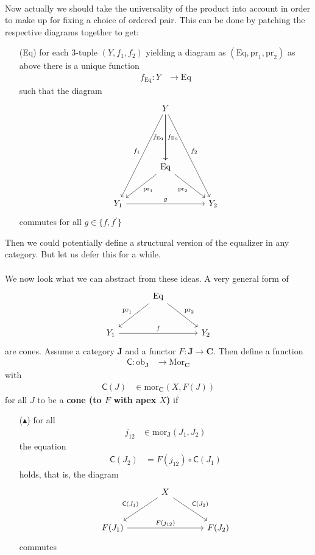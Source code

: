 \\
Now actually we should take the universality of the product into account in order to make up for fixing a choice of ordered pair. This can be done by patching the respective diagrams together to get:
\begin{enumerate}
\item[(Eq)]
for each $3$-tuple $(Y,f_{1},f_{2})$ yielding a diagram as $(\mathrm{Eq},\mathrm{pr}_{1},\mathrm{pr}_{2})$ as above there is a unique function
\begin{align*}
  f_{\mathrm{Eq}}
  \colon
  Y
  &\rightarrow
  \mathrm{Eq}
\end{align*}
such that the diagram
\[
\begin{tikzcd}[sep=large]
  &
  Y
  \arrow{dddr}{f_{2}}
  \arrow{dd}{f_{\mathrm{Eq}}}
  \arrow[swap]{dd}{f_{\mathrm{Eq}}}
  \arrow[swap]{dddl}{f_{1}}
  &
  \\
  &
  &
  \\
  &
  \mathrm{Eq}
  \arrow[swap]{dr}{\mathrm{pr}_{2}}
  \arrow{dl}{\mathrm{pr}_{1}}
  &
  \\
  Y_{1}
  \arrow{rr}{g}
  &
  &
  Y_{2}
\end{tikzcd}
\]
commutes for all $g \in \lbrace f,f^{\backprime} \rbrace$
\end{enumerate}
Then we could potentially define a structural version of the equalizer in any category. But let us defer this for a while.
\\\\
We now look what we can abstract from these ideas. A very general form of
\[
\begin{tikzcd}[sep=large]
  &
  \mathrm{Eq}
  \arrow{dr}{\mathrm{pr}_{2}}
  \arrow[swap]{dl}{\mathrm{pr}_{1}}
  &
  \\
  Y_{1}
  \arrow{rr}{f}
  &
  &
  Y_{2}
\end{tikzcd}
\]
are cones. Assume a category $\mathbf{J}$ and a functor $F \colon \mathbf{J} \rightarrow \mathbf{C}$. Then define a function
\begin{align*}
  \mathsf{C}
  \colon
  \mathrm{ob}_{\mathbf{J}}
  &\rightarrow
  \mathrm{Mor}_{\mathbf{C}}
\end{align*}
with
\begin{align*}
  \mathsf{C}(J)
  &\in
  \mathrm{mor}_{\mathbf{C}}(X,F(J))
\end{align*}
for all $J$ to be a \textbf{cone (to $F$ with apex $X$)} if
\begin{enumerate}
\item[($\blacktriangle$)]
for all
\begin{align*}
  j_{12}
  &\in
  \mathrm{mor}_{\mathbf{J}}(J_{1},J_{2})
\end{align*}
the equation
\begin{align*}
  \mathsf{C}(J_{2})
  &=
  F(j_{12})
  \circ
  \mathsf{C}(J_{1})
\end{align*}
holds, that is, the diagram
\[
\begin{tikzcd}[sep=large]
  &
  X
  \arrow{dr}{\mathsf{C}(J_{2})}
  \arrow[swap]{dl}{\mathsf{C}(J_{1})}
  &
  \\
  F(J_{1})
  \arrow{rr}{F(j_{12})}
  &
  &
  F(J_{2})
\end{tikzcd}
\]
commutes
\end{enumerate}

